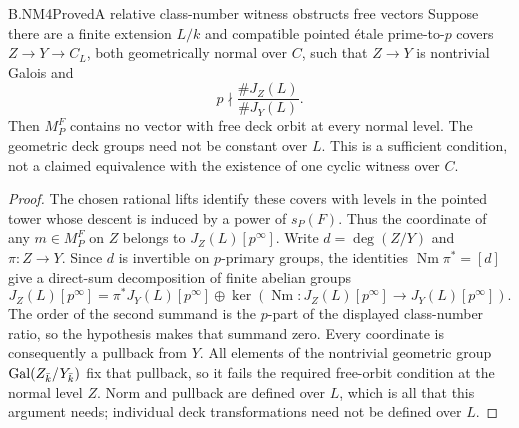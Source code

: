\begin{claim}{B.NM4}{Proved}{A relative class-number witness obstructs free vectors}
Suppose there are a finite extension $L/k$ and compatible pointed
étale prime-to-$p$ covers $Z\to Y\to C_L$, both geometrically
normal over $C$, such that $Z\to Y$ is nontrivial Galois and
\[
                           p\nmid\frac{\#J_Z(L)}{\#J_Y(L)}.
\]
Then $M_P^F$ contains no vector with free deck orbit at every
normal level. The geometric deck groups need not be constant over
$L$. This is a sufficient condition, not a claimed equivalence
with the existence of one cyclic witness over $C$.
\end{claim}
\begin{proof}
The chosen rational lifts identify these covers with levels in the
pointed tower whose descent is induced by a power of $s_P(F)$.
Thus the coordinate of any $m\in M_P^F$ on $Z$ belongs to
$J_Z(L)[p^\infty]$. Write $d=\deg(Z/Y)$ and
$\pi:Z\to Y$. Since $d$ is invertible on $p$-primary groups,
the identities $\operatorname{Nm}\pi^*=[d]$ give a direct-sum
decomposition of finite abelian groups
\[
 J_Z(L)[p^\infty]
 =\pi^*J_Y(L)[p^\infty]\oplus
       \ker\!\left(\operatorname{Nm}:J_Z(L)[p^\infty]
                                  \to J_Y(L)[p^\infty]\right).
\]
The order of the second summand is the $p$-part of the displayed
class-number ratio, so the hypothesis makes that summand zero.
Every coordinate is consequently a pullback from $Y$. All elements
of the nontrivial geometric group $\operatorname{Gal}(Z_{\bar k}/Y_{\bar k})$
fix that pullback, so it fails the required free-orbit condition
at the normal level $Z$. Norm and pullback are defined over $L$,
which is all that this argument needs; individual deck
transformations need not be defined over $L$.
\end{proof}

